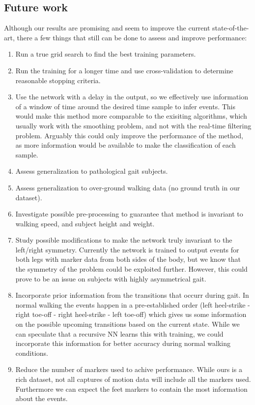 \documentclass{acm_proc_article-sp}
\begin{document}
\subsection{Future work}
Although our results are promising and seem to improve the current state-of-the-art, there a few things that still can be done to assess and improve performance:
\begin{enumerate}
 \item Run a true grid search to find the best training parameters.
 \item Run the training for a longer time and use cross-validation to determine reasonable stopping criteria.
 \item Use the network with a delay in the output, so we effectively use information of a window of time around the desired time sample to infer events. This would make this method more comparable to the exisiting algorithms, which usually work with the smoothing problem, and not with the real-time filtering problem. Arguably this could only improve the performance of the method, as more information would be available to make the classification of each sample.
 \item Assess generalization to pathological gait subjects.
 \item Assess generalization to over-ground walking data (no ground truth in our dataset).
 \item Investigate possible pre-processing to guarantee that method is invariant to walking speed, and subject height and weight.
 \item Study possible modifications to make the network truly invariant to the left/right symmetry. Currently the network is trained to output events for both legs with marker data from both sides of the body, but we know that the symmetry of the problem could be exploited further. However, this could prove to be an issue on subjects with highly asymmetrical gait.
 \item Incorporate prior information from the transitions that occurr during gait. In normal walking the events happen in a pre-established order (left heel-strike - right toe-off - right heel-strike - left toe-off) which gives us some information on the possible upcoming transitions based on the current state. While we can speculate that a recursive NN learns this with training, we could incorporate this information for better accuracy during normal walking conditions.
 \item Reduce the number of markers used to achive performance. While ours is a rich dataset, not all captures of motion data will include all the markers used. Furthermore we can expect the feet markers to contain the most information about the events.
\end{enumerate}
\end{document}
